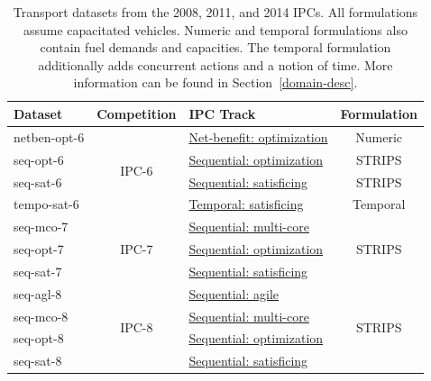 \begin{table}[tb]
\centering
\begin{tabular}{lclc}
\toprule
{\hspace{0.75em}\textbf{Dataset}} & \textbf{Competition} & {\hspace{2.5em}\textbf{IPC Track}} & \textbf{Formulation}\\ 
\midrule
netben-opt-6 & \multirow{4}{*}{IPC-6} & \href{http://icaps-conference.org/ipc2008/deterministic/NetBenefitOptimization.html}{Net-benefit: optimization} & Numeric \\ 
seq-opt-6 & & \href{http://icaps-conference.org/ipc2008/deterministic/SequentialOptimization.html}{Sequential: optimization} & STRIPS \\ 
seq-sat-6 & & \href{http://icaps-conference.org/ipc2008/deterministic/SequentialSatisficing.html}{Sequential: satisficing} & STRIPS \\ 
tempo-sat-6 & & \href{http://icaps-conference.org/ipc2008/deterministic/TemporalSatisficing.html}{Temporal: satisficing} & Temporal \\ 
\midrule
seq-mco-7 & \multirow{3}{*}{IPC-7} & \href{http://www.plg.inf.uc3m.es/ipc2011-deterministic/SequentialMulticore.html}{Sequential: multi-core} & \multirow{3}{*}{STRIPS} \\ 
seq-opt-7 & & \href{http://www.plg.inf.uc3m.es/ipc2011-deterministic/SequentialOptimization.html}{Sequential: optimization} &  \\ 
seq-sat-7 & & \href{http://www.plg.inf.uc3m.es/ipc2011-deterministic/SequentialSatisficing.html}{Sequential: satisficing} &  \\ 
\midrule
seq-agl-8 & \multirow{4}{*}{IPC-8} & \href{https://helios.hud.ac.uk/scommv/IPC-14/seqagi.html}{Sequential: agile} & \multirow{4}{*}{STRIPS} \\ 
seq-mco-8 & & \href{https://helios.hud.ac.uk/scommv/IPC-14/seqmulti.html}{Sequential: multi-core} &  \\ 
seq-opt-8 & & \href{https://helios.hud.ac.uk/scommv/IPC-14/seqopt.html}{Sequential: optimization} &  \\ 
seq-sat-8 & & \href{https://helios.hud.ac.uk/scommv/IPC-14/seqsat.html}{Sequential: satisficing} &  \\ 
\bottomrule
\end{tabular}
\caption[Transport datasets from the 2008, 2011, and 2014 IPCs.]{Transport datasets from the 2008, 2011, and 2014 IPCs. All formulations assume capacitated vehicles. Numeric and temporal formulations also contain fuel demands and capacities. The temporal formulation additionally adds concurrent actions and a notion of time. More information can be found in Section~\ref{domain-desc}.}
\label{tab:ipc-datasets}
\end{table}

